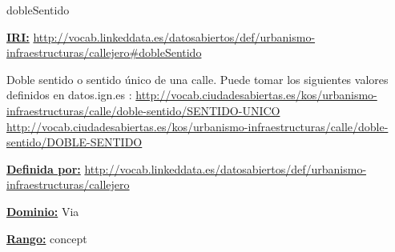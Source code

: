 \begin{mybox}{dobleSentido}
\begin{flushleft}
\underline{\textbf{IRI:}}
\url{http://vocab.linkeddata.es/datosabiertos/def/urbanismo-infraestructuras/callejero#dobleSentido}
\newline

Doble sentido o sentido único de una calle.
Puede tomar los siguientes valores definidos en datos.ign.es \cite{datosIgn_calzada}:
\newline \url{http://vocab.ciudadesabiertas.es/kos/urbanismo-infraestructuras/calle/doble-sentido/SENTIDO-UNICO}
\newline \url{http://vocab.ciudadesabiertas.es/kos/urbanismo-infraestructuras/calle/doble-sentido/DOBLE-SENTIDO}
\newline

\underline{\textbf{Definida por:}}\newline
\url{http://vocab.linkeddata.es/datosabiertos/def/urbanismo-infraestructuras/callejero}
\newline

\underline{\textbf{Dominio:}}
		Via
\newline

\underline{\textbf{Rango:}}
 concept
 \newline

\end{flushleft}
\end{mybox}












